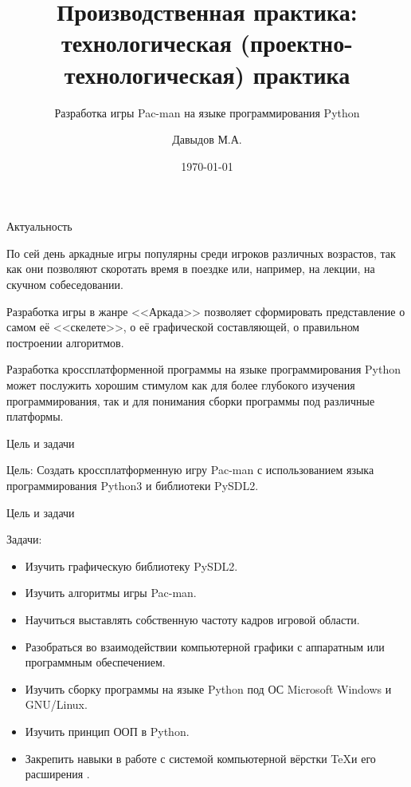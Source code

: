 \documentclass[12pt,a4paper,mathserif]{beamer}
\title{Производственная практика: технологическая (проектно-технологическая) практика}
\subtitle{Разработка игры Pac-man на языке программирования Python}
\author{Давыдов М.А.}
\institute{группа 5.205-1}
\date{\today}
\begin{document}
\begin{frame}
\maketitle
\end{frame}

\begin{frame}{Актуальность}
    \begin{block}{}
    По сей день аркадные игры популярны среди игроков различных возрастов, так как они позволяют скоротать время в поездке или, например, на лекции, на скучном собеседовании.
    \end{block}

    \begin{block}{}
    Разработка игры в жанре <<Аркада>> позволяет сформировать представление о самом её <<скелете>>, о её графической составляющей, о правильном построении алгоритмов.
    \end{block}

    \begin{block}{}
    Разработка кроссплатформенной программы на языке программирования Python может послужить хорошим стимулом как для более глубокого изучения программирования, так и для понимания сборки программы под различные платформы.
    \end{block}
\end{frame}

\begin{frame}{Цель и задачи}
    \begin{block}{Цель:}
        Создать кроссплатформенную игру Pac-man с использованием языка программирования Python3 и библиотеки PySDL2.
    \end{block}

\end{frame}

\begin{frame}{Цель и задачи}
    \begin{block}{Задачи:}
        \begin{itemize}
            \item Изучить графическую библиотеку PySDL2.
            \item Изучить алгоритмы игры Pac-man.
            \item Научиться выставлять собственную частоту кадров игровой области.
        	\item Разобраться во взаимодействии компьютерной графики с аппаратным или программным обеспечением.
        	\item Изучить сборку программы на языке Python под ОС Microsoft Windows и GNU/Linux.
        	\item Изучить принцип ООП в Python.
        	\item Закрепить навыки в работе с системой компьютерной вёрстки \TeX и его расширения \XeTeX.
        \end{itemize}
    \end{block}
\end{frame}
\end{document}
